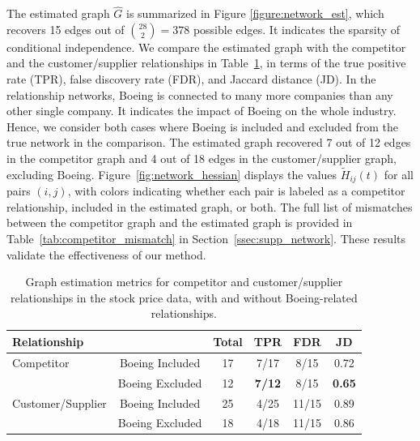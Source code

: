 \documentclass[11pt,a4paper,final]{article}
\numberwithin{equation}{section}
\theoremstyle{remark}
\begin{document}
The estimated graph $\widehat{G}$ is summarized in Figure \ref{figure:network_est}, which recovers 15 edges out of $\binom{28}{2} = 378$ possible edges. It indicates the sparsity of conditional independence. 
We compare the estimated graph with the competitor and the customer/supplier relationships in Table~\ref{tab:graph_metrics_with_boeing}, in terms of the true positive rate (TPR), false discovery rate (FDR), and Jaccard distance (JD). In the relationship networks, Boeing is connected to many more companies than any other single company. It indicates the impact of Boeing on the whole industry. Hence, we consider both cases where Boeing is included and excluded from the true network in the comparison. 
The estimated graph recovered 7 out of 12 edges in the competitor graph and 4 out of 18 edges in the customer/supplier graph, excluding Boeing. 
Figure~\ref{fig:network_hessian} displays the values $\widetilde H_{ij}(t)$ for all pairs $(i,j)$, with colors indicating whether each pair is labeled as a competitor relationship, included in the estimated graph, or both.
The full list of mismatches between the competitor graph and the estimated graph is provided in Table~\ref{tab:competitor_mismatch} in Section~\ref{ssec:supp_network}.
These results validate the effectiveness of our method.  

\begin{table}[!t]
\caption{Graph estimation metrics for competitor and customer/supplier relationships in the stock price data, with and without Boeing-related relationships.}
\label{tab:graph_metrics_with_boeing}
\footnotesize
\centering
\begin{tabular}{l|c|cccc}
\toprule
Relationship &  & Total & TPR & FDR & JD \\
\midrule
Competitor &Boeing Included&  17  & 7/17 & 8/15 & {0.72} \\
 & Boeing Excluded & 12 & \textbf{7/12} & 8/15 & \textbf{0.65} \\
 \hline
Customer/Supplier &Boeing Included & 25 & 4/25 & 11/15 & 0.89 \\
 & Boeing Excluded  &  18 & 4/18 & 11/15 & 0.86 \\
\bottomrule
\end{tabular}
\end{table}
\end{document}
